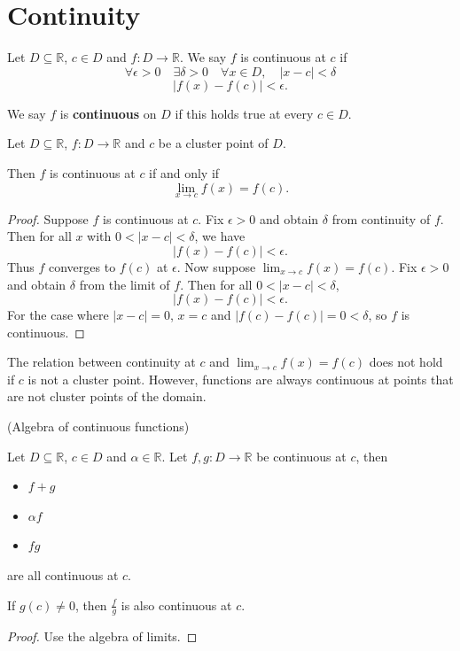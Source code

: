 \section{Continuity}

\begin{definition}
    Let $D \subseteq \mathbb{R}$, $c \in D$ and $f : D \rightarrow \mathbb{R}$. We say $f$ is continuous at $c$ if
    \[\forall \epsilon > 0 \quad \exists \delta > 0 \quad \forall x \in D, \quad |x - c | < \delta\]
    \[|f(x) - f(c) | < \epsilon.\]

    We say $f$ is {\bf continuous} on $D$ if this holds true at every $c \in D$.
\end{definition}

\begin{theorem}
    Let $D \subseteq \mathbb{R}$, $f : D \rightarrow \mathbb{R}$ and $c$ be a cluster point of $D$.

    Then $f$ is continuous at $c$ if and only if
    \[\lim_{x \rightarrow c} f(x) = f(c).\]
\end{theorem}
\begin{proof}
    Suppose $f$ is continuous at $c$. Fix $\epsilon > 0$ and obtain $\delta$ from continuity of $f$. Then for all $x$ with $0 < |x - c| < \delta$, we have
    \[|f(x) - f(c)| < \epsilon.\]
    Thus $f$ converges to $f(c)$ at $\epsilon$. Now suppose $\lim_{x \rightarrow c}f(x) = f(c)$. Fix $\epsilon > 0$ and obtain $\delta$ from the limit of $f$. Then for all $0 < | x - c | < \delta$,
    \[|f(x) - f(c) | < \epsilon.\]
    For the case where $|x - c| = 0$, $x = c$ and $|f(c) - f(c)| = 0 < \delta$, so $f$ is continuous.
\end{proof}

\begin{remark}
  The relation between continuity at $c$ and $\lim_{x\rightarrow c} f(x) = f(c)$ does not hold if $c$ is not a cluster point. However, functions are always continuous at points that are not cluster points of the domain.
\end{remark}

\begin{theorem} (Algebra of continuous functions)

  Let $D \subseteq \mathbb{R}$, $c \in D$ and $\alpha \in \mathbb{R}$. Let $f, g : D \rightarrow \mathbb{R}$ be continuous at $c$, then
  \begin{itemize}
    \item $f + g$
    \item $\alpha f$
    \item $fg$
  \end{itemize}
  are all continuous at $c$.

  If $g(c) \not = 0$, then $\frac{f}{g}$ is also continuous at $c$.
    
\end{theorem}
\begin{proof}
    Use the algebra of limits.
\end{proof}

